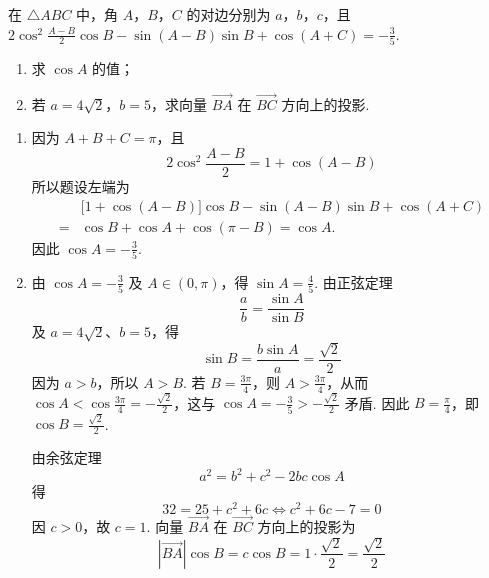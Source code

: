 \begin{problem}
在 \(\triangle ABC\) 中，角 \(A\)，\(B\)，\(C\) 的对边分别为 \(a\)，\(b\)，\(c\)，且 \(2\cos^2\frac{A - B}{2}\cos B - \sin (A - B)\sin B + \cos (A + C) = -\frac{3}{5}\).
\begin{enumerate}
\item 求 \(\cos A\) 的值；
\item 若 \(a = 4\sqrt{2}\)，\(b = 5\)，求向量 \(\overrightarrow{BA}\) 在 \(\overrightarrow{BC}\) 方向上的投影.
\end{enumerate}
\end{problem}

\begin{solution}
\begin{enumerate}
\item 因为 \(A+B+C=\pi\)，且
\[
2\cos^2\frac{A-B}{2}=1+\cos(A-B)
\]
所以题设左端为
\[
\begin{aligned}
&\bigl[1+\cos(A-B)\bigr]\cos B-\sin(A-B)\sin B+\cos(A+C)\\
={}&\cos B+\cos A+\cos(\pi-B)=\cos A.
\end{aligned}
\]
因此 \(\cos A=-\frac35\).

\item 由 \(\cos A=-\frac35\) 及 \(A\in(0,\pi)\)，得 \(\sin A=\frac45\). 由正弦定理
\[
\frac{a}{b}=\frac{\sin A}{\sin B}
\]
及 \(a=4\sqrt2\)、\(b=5\)，得
\[
\sin B=\frac{b\sin A}{a}=\frac{\sqrt2}{2}
\]
因为 \(a>b\)，所以 \(A>B\). 若 \(B=\frac{3\pi}{4}\)，则 \(A>\frac{3\pi}{4}\)，从而 \(\cos A<\cos\frac{3\pi}{4}=-\frac{\sqrt2}{2}\)，这与 \(\cos A=-\frac35>-\frac{\sqrt2}{2}\) 矛盾. 因此 \(B=\frac\pi4\)，即 \(\cos B=\frac{\sqrt2}{2}\).

由余弦定理
\[
a^2=b^2+c^2-2bc\cos A
\]
得
\[
32=25+c^2+6c
\iff c^2+6c-7=0
\]
因 \(c>0\)，故 \(c=1\). 向量 \(\overrightarrow{BA}\) 在 \(\overrightarrow{BC}\) 方向上的投影为
\[
|\overrightarrow{BA}|\cos B=c\cos B=1\cdot\frac{\sqrt2}{2}=\frac{\sqrt2}{2}
\]
\end{enumerate}
\end{solution}

